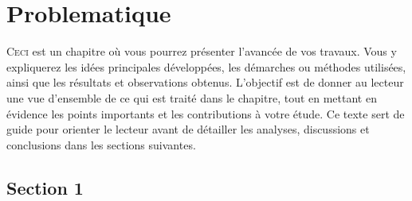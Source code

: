

\graphicspath{{5_Images/3_Problematique/}}                      %
\makeatletter
{}                    %
\makeatother


\chapter{Problematique}\label{chap:Problematique}               %

\begin{chapabstract}                                            %
    \lettrine[slope=0.5em,nindent=0.5em]{C}{eci}
    est un chapitre où vous pourrez présenter l’avancée de vos travaux. Vous y expliquerez les idées principales développées, les démarches ou méthodes utilisées, ainsi que les résultats et observations obtenus. L’objectif est de donner au lecteur une vue d’ensemble de ce qui est traité dans le chapitre, tout en mettant en évidence les points importants et les contributions à votre étude. Ce texte sert de guide pour orienter le lecteur avant de détailler les analyses, discussions et conclusions dans les sections suivantes.
\end{chapabstract}

\minitoc%
\newpage                                                        %


\section{Section 1}\label{sec:1_1}


